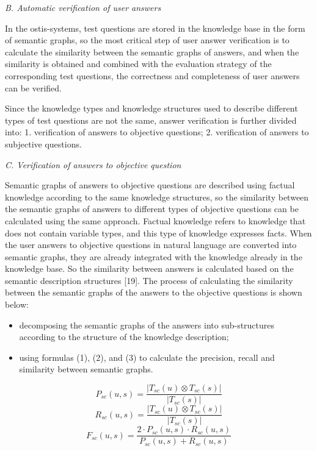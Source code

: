 \documentclass{article}
\begin{document}
\begin{multicols}{2}
\noindent\textit{B. Automatic verification of user answers}

In the ostis-systems, test questions are stored in the knowledge base in the form of semantic graphs, so the most critical step of user answer verification is to calculate the similarity between the semantic graphs of answers, and when the similarity is obtained and combined with the evaluation strategy of the corresponding test questions, the correctness and completeness of user answers can be verified.

Since the knowledge types and knowledge structures used to describe different types of test questions are not the same, answer verification is further divided into: 1. verification of answers to objective questions; 2. verification of answers to subjective questions.

\noindent\textit{C. Verification of answers to objective question}

Semantic graphs of answers to objective questions are described using factual knowledge according to the same knowledge structures, so the similarity between the semantic graphs of answers to different types of objective questions can be calculated using the same approach. Factual knowledge refers to knowledge that does not contain variable types, and this type of knowledge expresses facts. When the user answers to objective questions in natural language are converted into semantic graphs, they are already integrated with the knowledge already in the knowledge base. So the similarity between answers is calculated based on the semantic description structures [19]. The process of calculating the similarity between the semantic graphs of the answers to the objective questions is shown below:
\begin{itemize}
    \item decomposing the semantic graphs of the answers into sub-structures according to the structure of the knowledge description;
    \item using formulas (1), (2), and (3) to calculate the precision, recall and similarity between semantic graphs.
\end{itemize}

\begin{equation}
    P_{sc}(u,s) = \frac{| T_{sc}(u)\otimes T_{sc}(s)|}{|T_{sc}(s)|}
\end{equation}
\begin{equation}
 R_{sc}(u,s) = \frac{| T_{sc}(u)\otimes T_{sc}(s)|}{|T_{sc}(s)|}
\end{equation}
\begin{equation}
F_{sc}(u,s) = \frac{ 2 \cdot P_{sc}(u,s) \cdot R_{sc}(u,s)}{P_{sc}(u,s)+R_{sc}(u,s)} 
\end{equation}

\end{multicols} 
\end{document}
